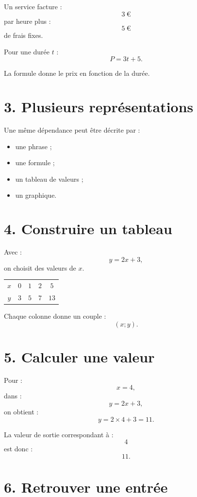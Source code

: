Un service facture :
\[
3\ \text{€}
\]
par heure plus :
\[
5\ \text{€}
\]
de frais fixes.

Pour une durée $t$ :
\[
P=3t+5.
\]

La formule donne le prix en fonction de la durée.

\section{3. Plusieurs représentations}

Une même dépendance peut être décrite par :
\begin{itemize}
\item une phrase ;
\item une formule ;
\item un tableau de valeurs ;
\item un graphique.
\end{itemize}


\section{4. Construire un tableau}

Avec :
\[
y=2x+3,
\]
on choisit des valeurs de $x$.

\begin{tabular}{c|c|c|c|c}
$x$ & $0$ & $1$ & $2$ & $5$ \\
$y$ & $3$ & $5$ & $7$ & $13$ \\
\end{tabular}

Chaque colonne donne un couple :
\[
(x;y).
\]

\section{5. Calculer une valeur}

Pour :
\[
x=4,
\]
dans :
\[
y=2x+3,
\]
on obtient :
\[
y=2\times4+3=11.
\]

La valeur de sortie correspondant à :
\[
4
\]
est donc :
\[
11.
\]

\section{6. Retrouver une entrée}

